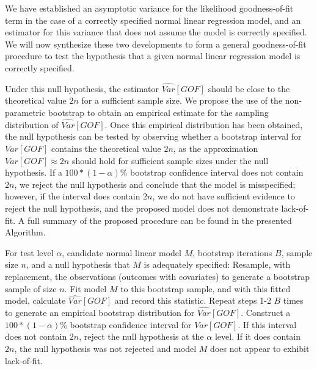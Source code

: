 \documentclass[sn-mathphys-ay]{sn-jnl}
\begin{document}
		We have established an asymptotic variance for the likelihood goodness-of-fit term in the case of a correctly specified normal linear regression model, and an
		estimator for this variance that does not assume the model is correctly specified. We will now synthesize these two developments to form a general goodness-of-fit procedure to
		test the hypothesis that a given normal linear regression model is correctly specified.

		Under this null hypothesis, the estimator $\widehat{Var}[GOF]$ should be close to the theoretical value $2n$ for a
		sufficient sample size. We propose the use of the non-parametric bootstrap to obtain an empirical estimate for the sampling distribution of $\widehat{Var}[GOF]$. Once this empirical distribution
		has been obtained, the null hypothesis can be tested by observing whether a bootstrap interval for $Var[GOF]$ contains the theoretical value $2n$, as the approximation
		$Var[GOF] \approx 2n$ should hold for sufficient sample sizes under the null hypothesis. If a $100*(1-\alpha)$\% bootstrap confidence interval does not contain 
		$2n$, we reject the null hypothesis and conclude that the model is misspecified; however, if the interval does contain $2n$, we do not have sufficient evidence to reject
		the null hypothesis, and the proposed model does not demonstrate lack-of-fit. A full summary of the proposed procedure can be found in the presented Algorithm.
		\begin{algorithm*}[h]
			\caption*{$\bf{Algorithm}$ Bootstrap Goodness-of-Fit Test for a Normal Linear Regression Model}
			\begin{algorithmic}[1]
			  \Statex For test level $\alpha$, candidate normal linear model $M$, bootstrap iterations $B$, sample size $n$, and a null hypothesis that $M$
			  is adequately specified:
			  \State Resample, with replacement, the observations (outcomes with covariates) to generate a bootstrap sample of size $n$.
			  \State Fit model $M$ to this bootstrap sample, and with this fitted model, calculate $\widehat{Var}[GOF]$
			  and record this statistic.
			  \State Repeat steps 1-2 $B$ times to generate an empirical bootstrap distribution for $\widehat{Var}[GOF]$.
			  \State Construct a $100*(1-\alpha)$\% bootstrap confidence interval for $Var[GOF]$.
			  \State If this interval does not contain $2n$, reject the null hypothesis at the $\alpha$ level. If it does contain
			  $2n$, the null hypothesis was not rejected and model $M$ does not appear to exhibit lack-of-fit. 
			\end{algorithmic}
		\end{algorithm*}
\end{document}
